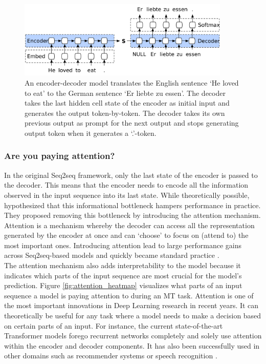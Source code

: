 \begin{figure}
	\centering\includegraphics[width=0.9\textwidth]{../visualizations/ch4-methods/enc_dec.pdf} 
	\caption{An encoder-decoder model \cite{ruderencdecgraphic} translates the English sentence `He loved to eat' to the German sentence `Er liebte zu essen'. The decoder takes the last hidden cell state of the encoder as initial input and generates the output token-by-token. The decoder takes its own previous output as prompt for the next output and stops generating output token when it generates a `.'-token. }
	\label{fig:encdec}
\end{figure}

\subsubsection{Are you paying attention?}
In the original Seq2seq framework, only the last state of the encoder is passed to the decoder. This means that the encoder needs to encode all the information observed in the input sequence into its last state. While theoretically possible, \cite{attention} hypothesized that this informational bottleneck hampers performance in practice. They proposed removing this bottleneck by introducing the attention mechanism. Attention is a mechanism whereby the decoder can access all the representation generated by the encoder at once and can `choose' to focus on (attend to) the most important ones. Introducing attention lead to large performance gains across Seq2seq-based models and quickly became standard practice \cite{attentionforms}. \\
The attention mechanism also adds interpretability to the model because it indicates which parts of the input sequence are most crucial for the model's prediction. Figure \ref{fig:attention_heatmap} visualizes what parts of an input sequence a model is paying attention to during an MT task. Attention is one of the most important innovations in Deep Learning research in recent years. It can theoretically be useful for any task where a model needs to make a decision based on certain parts of an input. For instance, the current state-of-the-art Transformer models \cite{allyouneed} \cite{bert} \cite{gpt3} forego recurrent networks completely and solely use attention within the encoder and decoder components. It has also been successfully used in other domains such as recommender systems \cite{attention_recommender_systems} or speech recognition \cite{attention_speech_recognition}. 


